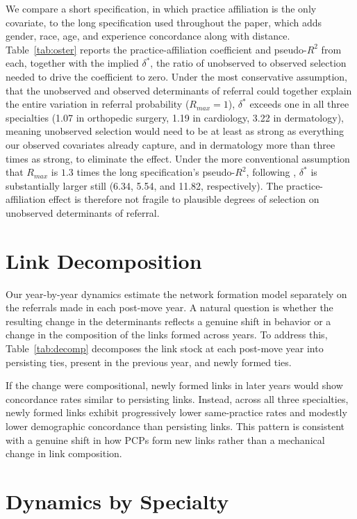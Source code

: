 \documentclass[12pt]{article}
\begin{document}
We compare a short specification, in which practice affiliation is the only covariate, to the long specification used throughout the paper, which adds gender, race, age, and experience concordance along with distance. Table~\ref{tab:oster} reports the practice-affiliation coefficient and pseudo-$R^2$ from each, together with the implied $\delta^*$, the ratio of unobserved to observed selection needed to drive the coefficient to zero. Under the most conservative assumption, that the unobserved and observed determinants of referral could together explain the entire variation in referral probability ($R_{max}=1$), $\delta^*$ exceeds one in all three specialties (1.07 in orthopedic surgery, 1.19 in cardiology, 3.22 in dermatology), meaning unobserved selection would need to be at least as strong as everything our observed covariates already capture, and in dermatology more than three times as strong, to eliminate the effect. Under the more conventional assumption that $R_{max}$ is $1.3$ times the long specification's pseudo-$R^2$, following \cite{oster2019}, $\delta^*$ is substantially larger still (6.34, 5.54, and 11.82, respectively). The practice-affiliation effect is therefore not fragile to plausible degrees of selection on unobserved determinants of referral.


\section{Link Decomposition}
\label{sec:link-decomp}

Our year-by-year dynamics estimate the network formation model separately on the referrals made in each post-move year. A natural question is whether the resulting change in the determinants reflects a genuine shift in behavior or a change in the composition of the links formed across years. To address this, Table~\ref{tab:decomp} decomposes the link stock at each post-move year into persisting ties, present in the previous year, and newly formed ties.

If the change were compositional, newly formed links in later years would show concordance rates similar to persisting links. Instead, across all three specialties, newly formed links exhibit progressively lower same-practice rates and modestly lower demographic concordance than persisting links. This pattern is consistent with a genuine shift in how PCPs form new links rather than a mechanical change in link composition.


\section{Dynamics by Specialty}
\label{sec:period-specific}
\end{document}
